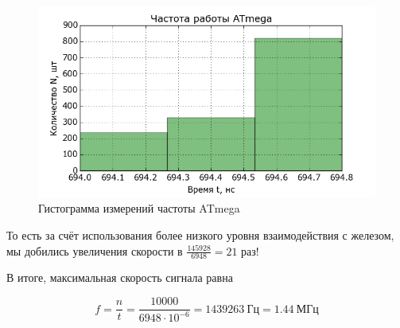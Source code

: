 \begin{figure}[ht]
    \includegraphics[width=.8\linewidth]{Figures/athist.png}
    \caption{Гистограмма измерений частоты ATmega}
    \label{fig:athist}
\end{figure}

То есть за счёт использования более низкого уровня взаимодействия с железом, мы добились увеличения скорости в $\frac{145928}{6948} = 21$ раз!

В итоге, максимальная скорость сигнала равна

\begin{equation}
    \label{eq:freq2}
    f = \frac{n}{t} = \frac{10000}{6948 \cdot 10^{-6}} = 1439263~\textrm{Гц} = 1.44~\textrm{МГц}
\end{equation}
